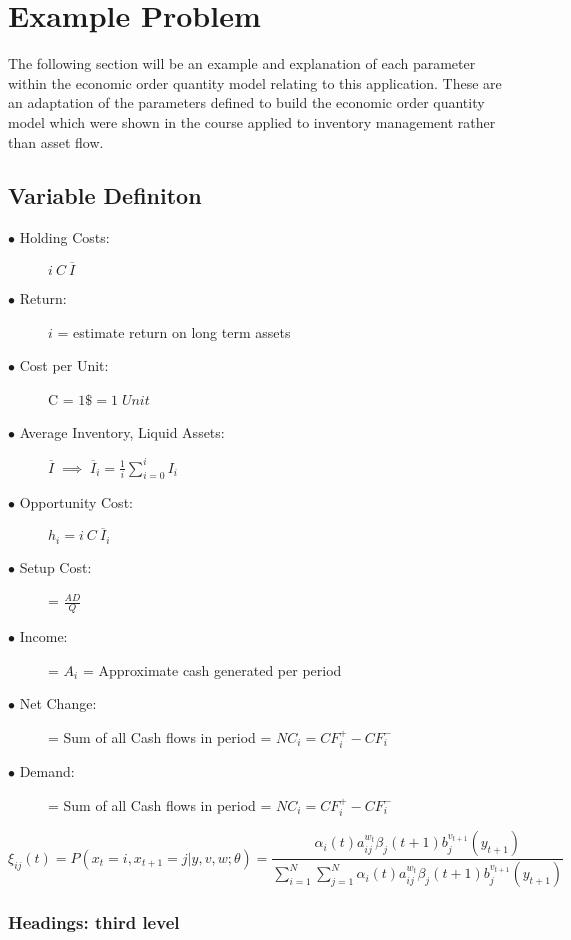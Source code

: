 \documentclass{article}
\begin{document}
\section{Example Problem}
The following section will be an example and explanation of each parameter within the economic order quantity model relating to this application. These are an adaptation of the parameters defined to build the economic order quantity model which were shown in the course applied to inventory management rather than asset flow.

\subsection{Variable Definiton}

\begin{description}
	\item[$\bullet$ Holding Costs:] $ i \:C\: \overline{I} $
	\item[$\bullet$ Return:] $ i $ = estimate return on long term assets
	\item[$\bullet$ Cost per Unit:] C = $1\$ =1 \; Unit $
	\item[$\bullet$ Average Inventory, Liquid Assets:] $\overline{I} \; \implies \; \overline{I}_{i} = \frac{1}{i}\sum_{i=0}^{i}I_{i}$
	\item[$\bullet$ Opportunity Cost:] $h_{i} = i \:C\: \overline{I}_{i}$
	\item[$\bullet$ Setup Cost:]  = $\frac{AD}{Q}$
	\item[$\bullet$ Income:]  = $A_{i}$ = Approximate cash generated per period
	\item[$\bullet$ Net Change:]= Sum of all Cash flows in period \;= $NC_{i} =CF_{i}^{+}-CF_{i}^{-}$
	\item[$\bullet$ Demand:]= Sum of all Cash flows in period \;= $NC_{i} =CF_{i}^{+}-CF_{i}^{-}$

\end{description}

\begin{equation}
	\xi _{ij}(t)=P(x_{t}=i,x_{t+1}=j|y,v,w;\theta)= {\frac {\alpha _{i}(t)a^{w_t}_{ij}\beta _{j}(t+1)b^{v_{t+1}}_{j}(y_{t+1})}{\sum _{i=1}^{N} \sum _{j=1}^{N} \alpha _{i}(t)a^{w_t}_{ij}\beta _{j}(t+1)b^{v_{t+1}}_{j}(y_{t+1})}}
\end{equation}

\subsubsection{Headings: third level}
\lipsum[6]
\end{document}
